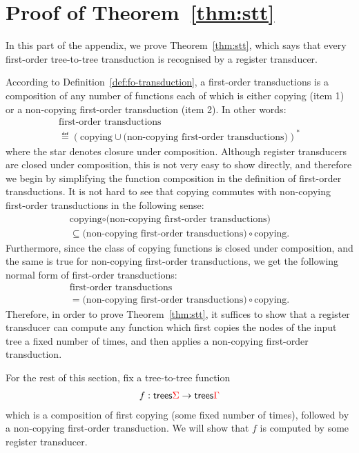 \section{Proof of Theorem~\ref{thm:stt}}
In this part of the appendix, we prove Theorem~\ref{thm:stt}, which says that every first-order tree-to-tree transduction is recognised by a register transducer. 

According to Definition~\ref{def:fo-transduction}, a first-order transductions is a composition of any number of functions each of which is either  copying (item 1) or a non-copying first-order transduction (item 2). In other words:
$$\begin{array}{c}
\text{first-order transductions} \\ \eqdef (\text{copying} \cup \text{(non-copying first-order transductions)})^*
\end{array}$$
where the star denotes closure under composition. Although register transducers are closed under composition, this is not very   easy to show directly, and therefore we begin by simplifying the function composition in the definition of first-order transductions.  It is not hard to see that copying commutes with non-copying first-order transductions in the following sense:
\begin{align*}
    \text{copying} \circ  \text{(non-copying first-order transductions)}  \\ \subseteq   \text{(non-copying first-order transductions)} \circ \text{copying}.
    \end{align*}
Furthermore, since the class of copying functions is closed under composition, and the same is true for non-copying first-order transductions, we get the following normal form of first-order transductions:
$$\begin{array}{c}
    \text{first-order transductions} \\=  \text{(non-copying first-order transductions)} \circ \text{copying}.
    \end{array}$$
Therefore, in order to prove Theorem~\ref{thm:stt}, it suffices to show that a register transducer can compute any function which first copies the nodes of the input tree a fixed number of times, and then applies a non-copying first-order transduction. 

For the rest of this section, fix  a tree-to-tree function
\begin{align*}
f : \mathsf {trees} {\color{red}{\Sigma}} \to \mathsf {trees} {\color{red}{\Gamma}}
\end{align*}
which is a composition of first copying (some fixed number of times), followed by a non-copying first-order transduction. We will show that $f$ is computed by some register transducer.  


